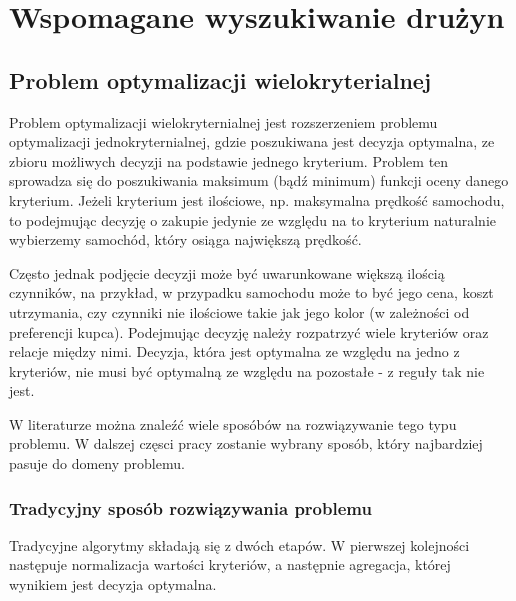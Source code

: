 \documentclass[a4paper,11pt]{article}
\begin{document}
\tableofcontents
\newpage

\section{Wspomagane wyszukiwanie drużyn}

\subsection{Problem optymalizacji wielokryterialnej}

Problem optymalizacji wielokryternialnej jest rozszerzeniem problemu optymalizacji jednokryternialnej, gdzie poszukiwana jest decyzja optymalna, ze zbioru możliwych decyzji na podstawie jednego kryterium. Problem ten sprowadza się do poszukiwania maksimum (bądź minimum) funkcji  oceny danego kryterium. Jeżeli kryterium jest ilościowe, np. maksymalna prędkość samochodu, to podejmując decyzję o zakupie jedynie ze względu na to kryterium naturalnie wybierzemy samochód, który osiąga największą prędkość.

Często jednak podjęcie decyzji może być uwarunkowane większą ilością czynników, na przykład, w przypadku samochodu może to być jego cena, koszt utrzymania, czy czynniki nie ilościowe takie jak jego kolor (w zależności od preferencji kupca). Podejmując decyzję należy rozpatrzyć wiele kryteriów oraz relacje między nimi. Decyzja, która jest optymalna ze względu na jedno z kryteriów, nie musi być optymalną ze względu na pozostałe - z reguły tak nie jest. 

W literaturze można znaleźć wiele sposóbów na rozwiązywanie tego typu problemu. W dalszej częsci pracy zostanie wybrany sposób, który najbardziej pasuje do domeny problemu.


\subsubsection{Tradycyjny sposób rozwiązywania problemu}

Tradycyjne algorytmy składają się z dwóch etapów. W pierwszej kolejności następuje normalizacja wartości kryteriów, a następnie agregacja, której wynikiem jest decyzja optymalna. 
\end{document}
